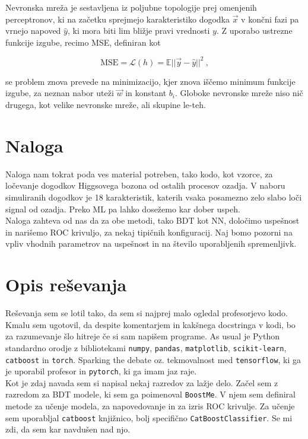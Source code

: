 \documentclass[a4paper]{article}
\begin{document}
Nevronska mreža je sestavljena iz poljubne topologije prej omenjenih perceptronov, ki na začetku sprejmejo karakteristiko 
dogodka $\vec{x}$ v končni fazi pa vrnejo napoved $\hat{y}$, ki mora biti lim bližje pravi vrednosti $y$. Z uporabo ustrezne
funkcije izgube, recimo MSE, definiran kot

\begin{equation}
    \mathrm{MSE} = \mathcal{L}(h) = \mathbb{E}||\vec{y}-\hat{y}||^2\>,
\end{equation}

se problem znova prevede na minimizacijo, kjer znova iščemo minimum funkcije izgube, za neznan nabor uteži $\vec{w}$ in konstant 
$b_i$. Globoke nevronske mreže niso nič drugega, kot velike nevronske mreže, ali skupine le-teh.
\section{Naloga}
Naloga nam tokrat poda ves material potreben, tako kodo, kot vzorce, za ločevanje dogodkov Higgsovega bozona od ostalih procesov
ozadja. V naboru simuliranih dogodkov je 18 karakteristik, katerih vsaka posamezno zelo slabo loči signal od ozadja. Preko ML pa 
lahko dosežemo kar dober uspeh.\\

Naloga zahteva od nas da za obe metodi, tako BDT kot NN, določimo uspešnost in narišemo ROC krivuljo, za nekaj tipičnih konfiguracij.
Naj bomo pozorni na vpliv vhodnih parametrov na uspešnost in na število uporabljenih spremenljivk.

\section{Opis reševanja}
Reševanja sem se lotil tako, da sem si najprej malo ogledal profesorjevo kodo. Kmalu sem ugotovil, da despite 
komentarjem in kakšnega docstringa v kodi, bo za razumevanje šlo hitreje če si sam napišem programe. As usual 
je Python standardno orodje z bibliotekami \texttt{numpy}, \texttt{pandas}, \texttt{matplotlib}, \texttt{scikit-learn},
\texttt{catboost} in \texttt{torch}. Sparking the debate oz. tekmovalnost med \texttt{tensorflow}, ki ga je uporabil 
profesor in \texttt{pytorch}, ki ga imam jaz raje. \\

Kot je zdaj navada sem si napisal nekaj razredov za lažje delo. Začel sem z razredom za BDT modele, ki sem ga poimenoval
\texttt{BoostMe}. V njem sem definiral metode za učenje modela, za napovedovanje in za izris ROC krivulje. Za učenje sem
uporabljal \texttt{catboost} knjižnico, bolj specifično \texttt{CatBoostClassifier}. Se mi zdi, da sem kar navdušen nad
njo. \\
\end{document}
